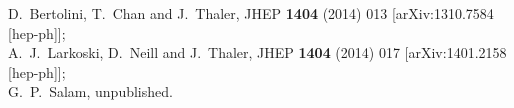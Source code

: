 \documentclass[12pt,a4]{article}
\begin{document}
\begin{thebibliography}{99}
  D.~Bertolini, T.~Chan and J.~Thaler,
  JHEP {\bf 1404} (2014) 013
  [arXiv:1310.7584 [hep-ph]];\\
  A.~J.~Larkoski, D.~Neill and J.~Thaler,
  JHEP {\bf 1404} (2014) 017
  [arXiv:1401.2158 [hep-ph]];\\
%  
  G.~P.~Salam, unpublished.
\end{thebibliography}
\end{document}
